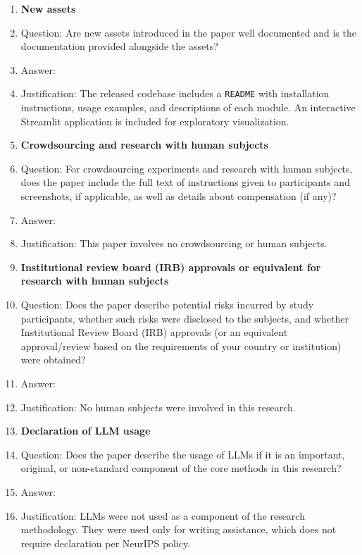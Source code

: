 \begin{enumerate}
\item {\bf New assets}
    \item[] Question: Are new assets introduced in the paper well documented and is the documentation provided alongside the assets?
    \item[] Answer: \answerYes{}
    \item[] Justification: The released codebase includes a \texttt{README} with installation instructions, usage examples, and descriptions of each module. An interactive Streamlit application is included for exploratory visualization.

\item {\bf Crowdsourcing and research with human subjects}
    \item[] Question: For crowdsourcing experiments and research with human subjects, does the paper include the full text of instructions given to participants and screenshots, if applicable, as well as details about compensation (if any)?
    \item[] Answer: \answerNA{}
    \item[] Justification: This paper involves no crowdsourcing or human subjects.

\item {\bf Institutional review board (IRB) approvals or equivalent for research with human subjects}
    \item[] Question: Does the paper describe potential risks incurred by study participants, whether such risks were disclosed to the subjects, and whether Institutional Review Board (IRB) approvals (or an equivalent approval/review based on the requirements of your country or institution) were obtained?
    \item[] Answer: \answerNA{}
    \item[] Justification: No human subjects were involved in this research.

\item {\bf Declaration of LLM usage}
    \item[] Question: Does the paper describe the usage of LLMs if it is an important, original, or non-standard component of the core methods in this research?
    \item[] Answer: \answerNA{}
    \item[] Justification: LLMs were not used as a component of the research methodology. They were used only for writing assistance, which does not require declaration per NeurIPS policy.

\end{enumerate}
